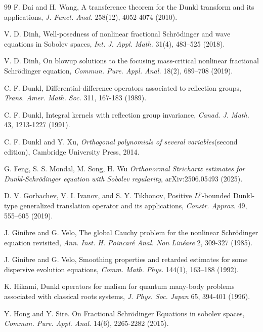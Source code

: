 \documentclass[a4paper,11pt, reqno]{amsart}
\theoremstyle{definition}
\theoremstyle{remark}
\numberwithin{equation}{section}
\begin{document}
\begin{thebibliography}{99}
        \label{Dai-Wang} F. Dai and H. Wang, {A transference theorem for the Dunkl transform and its applications}, \emph{J. Funct. Anal.} {258}(12), 4052-4074 (2010).

          V. D. Dinh, Well-posedness of nonlinear fractional Schr\"odinger and wave equations in Sobolev spaces, \emph{Int. J. Appl. Math.}
31(4), 483–525 (2018).

         V. D. Dinh, On blowup solutions to the focusing mass-critical nonlinear fractional Schr\"odinger equation, \emph{Commun. Pure. Appl. Anal.} 18(2),  689–708 (2019).

        \label{dun} 	C. F. Dunkl,  Differential-difference operators associated to reflection groups, \emph{Trans. Amer. Math. Soc.} 311, 167-183 (1989).

         C. F. Dunkl,  Integral kernels with reflection group invariance, \emph{Canad. J. Math.}  43, 1213-1227 (1991).

          C. F. Dunkl and  Y. Xu, \emph{Orthogonal polynomials of several variables}(second edition), Cambridge
		University Press, 2014.

         \label{FMSW} G. Feng, S. S. Mondal, M. Song, H. Wu \emph{Orthonormal Strichartz estimates for Dunkl-Schr\"{o}dinger equation with Sobolev regularity}, arXiv:2506.05493 (2025).

         D. V. Gorbachev, V. I. Ivanov, and S. Y. Tikhonov, {Positive $L^p$-bounded Dunkl-type generalized translation operator and its applications}, \emph{Constr. Approx.} {49}, 555–605 (2019).

         	J. Ginibre and G. Velo, The global Cauchy problem for the nonlinear Schrödinger equation revisited, \emph{Ann. Inst. H. Poincaré Anal. Non Linéare} 2, 309-327 (1985).

         	J. Ginibre and G. Velo, Smoothing properties and retarded estimates for some dispersive evolution equations,  \emph{Comm. Math. Phys.} 144(1), 163–188 (1992).

         	K. Hikami, Dunkl operators for malism for quantum many-body problems associated with classical roots systems, \emph{J. Phys. Soc. Japan} 65, 394-401 (1996).
        
         Y. Hong and  Y. Sire. On Fractional Schrödinger Equations in sobolev spaces, \emph{Commun. Pure. Appl. Anal.} 14(6), 2265-2282 (2015).


\end{thebibliography}
\end{document}
